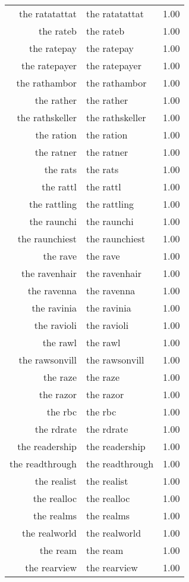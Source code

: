 \begin{table}[ht]
\begin{tabular}{rlr}
  the ratatattat & the ratatattat & 1.00 \\ 
  the rateb & the rateb & 1.00 \\ 
  the ratepay & the ratepay & 1.00 \\ 
  the ratepayer & the ratepayer & 1.00 \\ 
  the rathambor & the rathambor & 1.00 \\ 
  the rather & the rather & 1.00 \\ 
  the rathskeller & the rathskeller & 1.00 \\ 
  the ration & the ration & 1.00 \\ 
  the ratner & the ratner & 1.00 \\ 
  the rats & the rats & 1.00 \\ 
  the rattl & the rattl & 1.00 \\ 
  the rattling & the rattling & 1.00 \\ 
  the raunchi & the raunchi & 1.00 \\ 
  the raunchiest & the raunchiest & 1.00 \\ 
  the rave & the rave & 1.00 \\ 
  the ravenhair & the ravenhair & 1.00 \\ 
  the ravenna & the ravenna & 1.00 \\ 
  the ravinia & the ravinia & 1.00 \\ 
  the ravioli & the ravioli & 1.00 \\ 
  the rawl & the rawl & 1.00 \\ 
  the rawsonvill & the rawsonvill & 1.00 \\ 
  the raze & the raze & 1.00 \\ 
  the razor & the razor & 1.00 \\ 
  the rbc & the rbc & 1.00 \\ 
  the rdrate & the rdrate & 1.00 \\ 
  the readership & the readership & 1.00 \\ 
  the readthrough & the readthrough & 1.00 \\ 
  the realist & the realist & 1.00 \\ 
  the realloc & the realloc & 1.00 \\ 
  the realms & the realms & 1.00 \\ 
  the realworld & the realworld & 1.00 \\ 
  the ream & the ream & 1.00 \\ 
  the rearview & the rearview & 1.00 \\ 

\end{tabular}
\end{table}
